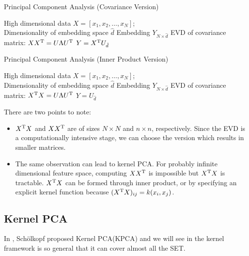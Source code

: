 \begin{algorithm}[htb]
	\caption{Principal Component Analysis (Covariance Version)}
	\label{alg:pca_cov}
	\begin{algorithmic}[1]
		\REQUIRE High dimensional data $X = [x_1, x_2, \ldots, x_N]$; \\
			Dimensionality of embedding space $ \hat{d} $
		\ENSURE Embedding $ Y_{N \times \hat{d}} $
		\STATE EVD of covariance matrix: $ XX^\mathrm{T} = U \Lambda U^\mathrm{T} $
		\STATE $ Y = X^\mathrm{T} U_{\hat{d}} $
	\end{algorithmic}
\end{algorithm}

\begin{algorithm}[htb]
	\caption{Principal Component Analysis (Inner Product Version)}
	\label{alg:pca_in}
	\begin{algorithmic}[1]
		\REQUIRE High dimensional data $X = [x_1, x_2, \ldots, x_N]$; \\
			Dimensionality of embedding space $ \hat{d} $
		\ENSURE Embedding $ Y_{N \times \hat{d}} $
		\STATE EVD of covariance matrix: $ X^\mathrm{T}X = U \Lambda U^\mathrm{T} $
		\STATE $ Y = U_{\hat{d}} $
	\end{algorithmic}
\end{algorithm}

There are two points to note:
\begin{itemize}
	\item $ X^\mathrm{T}X $ and $ XX^\mathrm{T} $ are of sizes $ N \times N $ and 
	$ n \times n $, respectively. Since the EVD is a computationally 
	intensive stage, we can choose the version which results in smaller 
	matrices. 
	\item The same observation can lead to kernel PCA. For probably 
	infinite dimensional feature space, computing $ XX^\mathrm{T} $ 
	is impossible but $ X^\mathrm{T}X $ is tractable. $ X^\mathrm{T}X $
	can be formed through inner product, or by specifying an 
	explicit kernel function because $ (X^\mathrm{T}X)_{ij} = k(x_i,x_j) $. 
\end{itemize}

\subsection{Kernel PCA}
\label{sec:kpca}

In \cite{scholkopf1998kpca}, Sch{\"o}lkopf proposed 
Kernel PCA(KPCA) and we will see in \rsec{\ref{sec:kfx}}
the kernel framework is so general that it can 
cover almost all the SET. 

